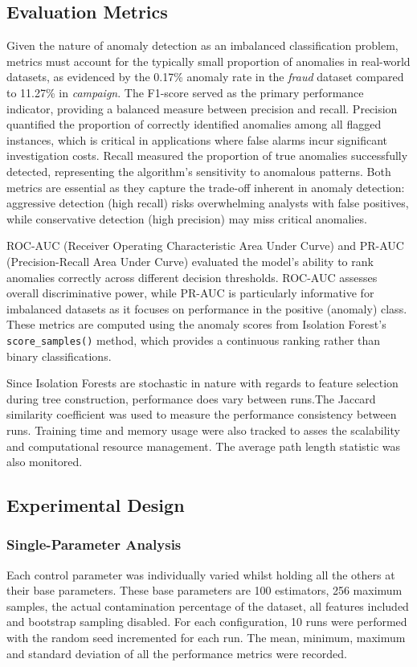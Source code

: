 \documentclass[10pt, conference]{IEEEtran}
\begin{document}
\subsection{Evaluation Metrics}
Given the nature of anomaly detection as an imbalanced classification problem, metrics must account for the typically small proportion of anomalies in real-world datasets, as evidenced by the 0.17\% anomaly rate in the \textit{fraud} dataset compared to 11.27\% in \textit{campaign}. The F1-score served as the primary performance indicator, providing a balanced measure between precision and recall. Precision quantified the proportion of correctly identified anomalies among all flagged instances, which is critical in applications where false alarms incur significant investigation costs. Recall measured the proportion of true anomalies successfully detected, representing the algorithm's sensitivity to anomalous patterns. Both metrics are essential as they capture the trade-off inherent in anomaly detection: aggressive detection (high recall) risks overwhelming analysts with false positives, while conservative detection (high precision) may miss critical anomalies.

ROC-AUC (Receiver Operating Characteristic Area Under Curve) and PR-AUC (Precision-Recall Area Under Curve) evaluated the model's ability to rank anomalies correctly across different decision thresholds. ROC-AUC assesses overall discriminative power, while PR-AUC is particularly informative for imbalanced datasets as it focuses on performance in the positive (anomaly) class. These metrics are computed using the anomaly scores from Isolation Forest's \texttt{score\_samples()} method, which provides a continuous ranking rather than binary classifications.

Since Isolation Forests are stochastic in nature with regards to feature selection during tree construction, performance does vary between runs.The Jaccard similarity coefficient was used to measure the performance consistency between runs. Training time and memory usage were also tracked to asses the scalability and computational resource management. The average path length statistic was also monitored.
\subsection{Experimental Design}
\subsubsection{Single-Parameter Analysis}
Each control parameter was individually varied whilst holding all the others at their base parameters. These base parameters are 100 estimators, 256 maximum samples, the actual contamination percentage of the dataset, all features included and bootstrap sampling disabled. For each configuration, 10 runs were performed with the random seed incremented for each run. The mean, minimum, maximum and standard deviation of all the performance metrics were recorded.
\end{document}
